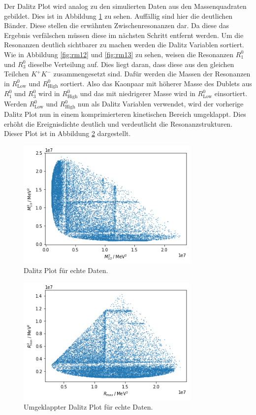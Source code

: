 Der Dalitz Plot wird analog zu den simulierten Daten aus den Massenquadraten gebildet.
Dies ist in Abbildung \ref{fig:dalitzReal} zu sehen.
Auffällig sind hier die deutlichen Bänder.
Diese stellen die erwähnten Zwischenresonanzen dar.
Da diese das Ergebnis verfälschen müssen diese im nächsten Schritt entfernt werden.
Um die Resonanzen deutlich sichtbarer zu machen werden die Dalitz Variablen sortiert.
Wie in Abbildung \ref{fig:rm12} und \ref{fig:rm13} zu sehen, weisen die Resonanzen $R_1^0$ und $R_3^0$ dieselbe Verteilung auf.
Dies liegt daran, dass diese aus den gleichen Teilchen $K^+K^-$ zusammengesetzt sind.
Dafür werden die Massen der Resonanzen in $R_\text{Low}^0$ und $R_\text{High}^0$ sortiert.
Also das Kaonpaar mit höherer Masse des Dublets aus $R_1^0$ und $R_3^0$ wird in $R_\text{High}^0$ und das mit niedrigerer Masse wird in $R_\text{Low}^0$ einsortiert.
Werden $R_\text{Low}^0$ und $R_\text{High}^0$ nun als Dalitz Variablen verwendet, wird der vorherige Dalitz Plot nun in einem komprimierteren kinetischen Bereich umgeklappt.
Dies erhöht die Ereignisdichte deutlich und verdeutlicht die Resonanzstrukturen.
Dieser Plot ist in Abbildung \ref{fig:klappeDalitz} dargestellt.

\begin{figure}
  \centering
  \includegraphics[width=0.8\textwidth]{plots/real_data_dalitz_plot.png}
  \caption{Dalitz Plot für echte Daten.}
  \label{fig:dalitzReal}
\end{figure}

\begin{figure}
  \centering
  \includegraphics[width=0.8\textwidth]{plots/real_data_sorted_dalitz.png}
  \caption{Umgeklappter Dalitz Plot für echte Daten.}
  \label{fig:klappeDalitz}
\end{figure}

